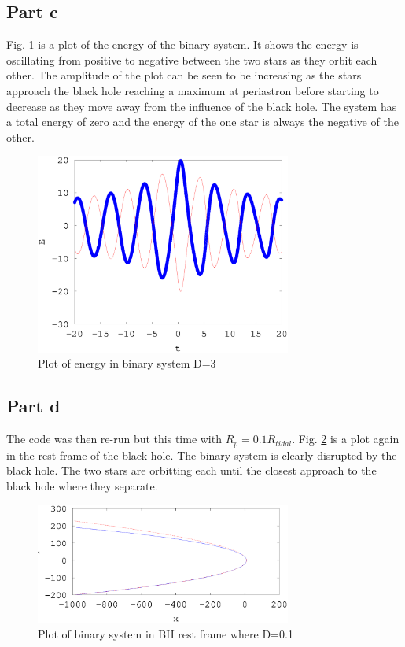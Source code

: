 \documentclass[a4paper,12pt]{article}
\begin{document}
\subsection{Part c}
Fig. \ref{fig:problem3_3} is a plot of the energy of the binary system. It shows the energy is oscillating from positive to negative between the two stars as they orbit each other. The amplitude of the plot can be seen to be increasing as the stars approach the black hole reaching a maximum at periastron before starting to decrease as they move away from the influence of the black hole. The system has a total energy of zero and the energy of the one star is always the negative of the other.
\begin{figure}[H]
\centering
\includegraphics[width=0.75\textwidth]{./problem3/problem3_3}
\caption{Plot of energy in binary system D=3}
\label{fig:problem3_3}
\end{figure}

\subsection{Part d}
The code was then re-run but this time with $R_p=0.1R_{tidal}$.
Fig. \ref{fig:problem3_4} is a plot again in the rest frame of the black hole.
The binary system is clearly disrupted by the black hole. The two stars are orbitting each until the closest approach to the black hole where they separate.
\begin{figure}[H]
\centering
\includegraphics[width=0.75\textwidth]{./problem3/problem3_4}
\caption{Plot of binary system in BH rest frame where D=0.1}
\label{fig:problem3_4}
\end{figure}
\end{document}
